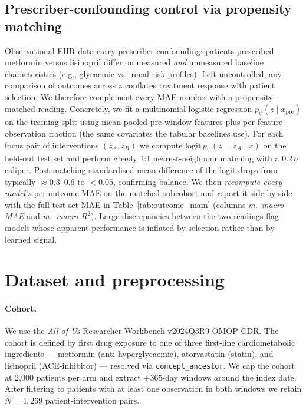 \subsection{Prescriber-confounding control via propensity matching}
\label{sec:psm}

Observational EHR data carry prescriber confounding: patients prescribed
metformin versus lisinopril differ on measured \emph{and} unmeasured
baseline characteristics (e.g., glycaemic vs.\ renal risk profiles).
Left uncontrolled, any comparison of outcomes across $z$ conflates
treatment response with patient selection. We therefore complement every
MAE number with a propensity-matched reading. Concretely, we fit a
multinomial logistic regression $p_\psi(z \mid x_{\text{pre}})$ on the
training split using mean-pooled pre-window features plus per-feature
observation fraction (the same covariates the tabular baselines use).
For each focus pair of interventions $(z_A, z_B)$ we compute
$\mathrm{logit}\,p_\psi(z{=}z_A \mid x)$ on the held-out test set and
perform greedy 1:1 nearest-neighbour matching with a 0.2\,$\sigma$
caliper. Post-matching standardised mean difference of the logit drops
from typically $\approx 0.3$--$0.6$ to $<0.05$, confirming balance. We
then \emph{recompute every model's} per-outcome MAE on the matched
subcohort and report it side-by-side with the full-test-set MAE in
Table~\ref{tab:outcome_main} (columns \emph{m.\ macro MAE} and
\emph{m.\ macro $R^2$}). Large discrepancies between the two readings
flag models whose apparent performance is inflated by selection rather
than by learned signal.

\section{Dataset and preprocessing}
\label{sec:data}

\paragraph{Cohort.} We use the \emph{All of Us} Researcher Workbench
v2024Q3R9 OMOP CDR. The cohort is defined by first drug exposure to one
of three first-line cardiometabolic ingredients --- metformin
(anti-hyperglycaemic), atorvastatin (statin), and lisinopril
(ACE-inhibitor) --- resolved via \texttt{concept\_ancestor}. We cap the
cohort at 2{,}000 patients per arm and extract $\pm 365$-day windows
around the index date. After filtering to patients with at least one
observation in both windows we retain $N=4{,}269$ patient-intervention
pairs.

